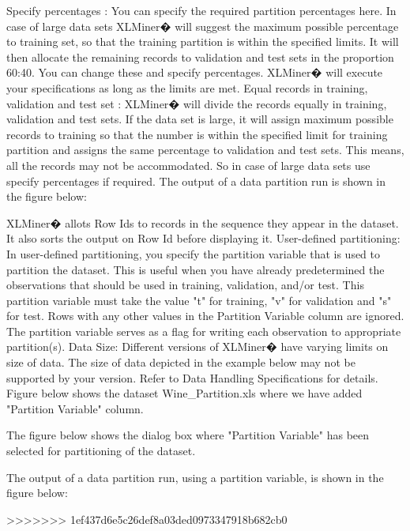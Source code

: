 Specify percentages : You can specify the required partition percentages here. In case of large data sets XLMiner� will suggest the maximum possible percentage to training set, so that the training partition is within the specified limits. It will then allocate the remaining records to validation and test sets in the proportion 60:40. You can change these and specify percentages. XLMiner�  will execute your specifications as long as the limits are met. 
Equal records in training, validation and test set : XLMiner�  will divide the records equally in training, validation and test sets. If the data set is large, it will assign maximum possible records to training so that the number is within the specified limit for training partition and assigns the same percentage to validation and test sets. This means, all the records may not be accommodated. So in case of large data sets use specify percentages if required.
 The output of a data partition run is shown in the figure below:

XLMiner� allots Row Ids to records in the sequence they appear in the dataset. It also sorts the output on Row Id before displaying it.
User-defined partitioning: In user-defined partitioning, you specify the partition variable that is used to partition the dataset. This is useful when you have already predetermined the observations that should be used in training, validation, and/or test. This partition variable must take the value "t" for training, "v" for validation and "s" for test. Rows with any other values in the Partition Variable column are ignored. The partition variable serves as a flag for writing each observation to appropriate partition(s).
Data Size: Different versions of XLMiner�  have varying limits on size of data. The size of data depicted in the example below may not be supported by your version. Refer to Data Handling Specifications for details.
Figure below shows the dataset Wine_Partition.xls where we have added "Partition Variable" column.

The figure below shows the dialog box where "Partition Variable" has been selected for partitioning of the dataset.
   
The output of a data partition run, using a partition variable, is shown in the figure below:

 
>>>>>>> 1ef437d6e5c26def8a03ded0973347918b682cb0
